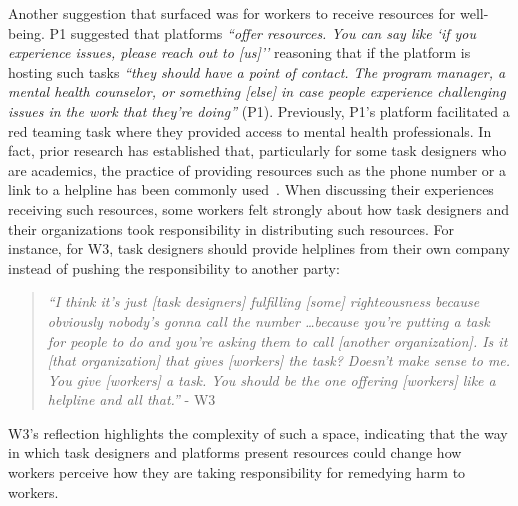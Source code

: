 Another suggestion that surfaced was for workers to receive resources for well-being. P1 suggested that platforms \textit{``offer resources. You can say like `if you experience issues, please reach out to [us]''} reasoning that if the platform is hosting such tasks \textit{``they should have a point of contact. The program manager, a mental health counselor, or something [else] in case people experience challenging issues in the work that they're doing''} (P1). Previously, P1's platform facilitated a red teaming task where they provided access to mental health professionals. In fact, prior research has established that, particularly for some task designers who are academics, the practice of providing resources such as the phone number or a link to a helpline has been commonly used~\cite{qian2025locating, Zhang2024PerceptionsTriggerWarnings}. When discussing their experiences receiving such resources, some workers felt strongly about how task designers and their organizations took responsibility in distributing such resources. For instance, for W3, task designers should provide helplines from their own company instead of pushing the responsibility to another party:
\begin{quote}
    \textit{``I think it's just [task designers] fulfilling [some] righteousness because obviously nobody's gonna call the number \dots because you're putting a task for people to do and you're asking them to call [another organization]. Is it [that organization] that gives [workers] the task? Doesn't make sense to me. You give [workers] a task. You should be the one offering [workers] like a helpline and all that.''} - W3
\end{quote}
W3's reflection highlights the complexity of such a space, indicating that the way in which task designers and platforms present resources could change how workers perceive how they are taking responsibility for remedying harm to workers. 
